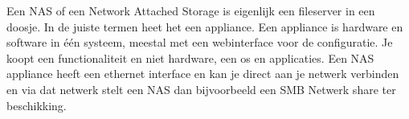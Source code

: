 Een NAS of een Network Attached Storage is eigenlijk een fileserver in een doosje. In de juiste termen heet het een appliance. Een appliance is hardware en software in \'e\'en systeem, meestal met een webinterface voor de configuratie. Je koopt een functionaliteit en niet hardware, een os en applicaties. Een NAS appliance heeft een ethernet interface en kan je direct aan je netwerk verbinden en via dat netwerk stelt een NAS dan bijvoorbeeld een SMB Netwerk share ter beschikking.
